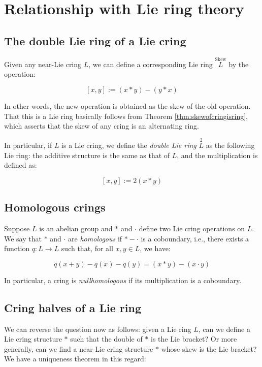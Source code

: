 \documentclass[10pt]{amsart}
\newcommand{\Skew}{\operatorname{Skew}}
\begin{document}
\section{Relationship with Lie ring theory}

\subsection{The double Lie ring of a Lie cring}

Given any near-Lie cring $L$, we can define a
corresponding Lie ring $\stackrel{\Skew}{L}$ by the operation:

$$[x,y] := (x * y) - (y * x)$$

In other words, the new operation is obtained as the skew of the old
operation. That this is a Lie ring basically follows from Theorem
\ref{thm:skewofcringisring}, which asserts that the skew of any cring
is an alternating ring.

In particular, if $L$ is a Lie cring, we define the {\em double Lie
ring} $\stackrel{2}{L}$ as the following Lie ring: the additive
structure is the same as that of $L$, and the multiplication is
defined as:

$$[x,y] := 2(x * y)$$

\subsection{Homologous crings}

Suppose $L$ is an abelian group and $*$ and $\cdot$ define two Lie
cring operations on $L$. We say that $*$ and $\cdot$ are {\em
homologous} if $* - \cdot$ is a coboundary, i.e., there exists a
function $q:L \to L$ such that, for all $x,y \in L$, we have:

$$q(x + y) - q(x) - q(y) = (x * y) - (x \cdot y)$$

In particular, a cring is {\em nullhomologous} if its multiplication
is a coboundary.

\subsection{Cring halves of a Lie ring}

We can reverse the question now as follows: given a Lie ring $L$, can
we define a Lie cring structure $*$ such that the double of $*$ is
the Lie bracket? Or more generally, can we find a near-Lie cring
structure $*$ whose skew is the Lie bracket? We have a uniqueness
theorem in this regard:
\end{document}
